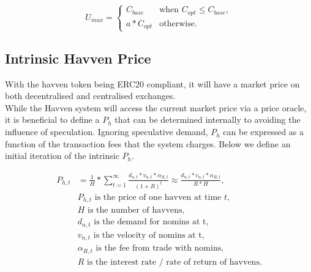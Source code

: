 \[
U_{max} = 
\begin{cases}
 C_{base} &\mbox{when } C_{opt} \leq C_{base}, \\[1em]
 a * C_{opt} &\mbox{otherwise}.
 \end{cases}
\]

\begin{center}
\end{center}

\newpage

\subsection{Intrinsic Havven Price} With the havven token being ERC20 compliant, it will have a market price on both decentralised and centralised exchanges. \\

\noindent While the Havven system will access the current market price via a price oracle, it is beneficial to define a $P_h$ that can be determined internally to avoiding the influence of speculation. Ignoring speculative demand, $P_h$ can be expressed as a function of the transaction fees that the system charges. Below we define an initial iteration of the intrinsic $P_h$.

\begin{align*} 
P_{h,t} &= \frac{1}{H}* \sum\limits_{t=1}^\infty \frac{d_{n,t} *v_{n,t} * \alpha_{R,t}}{(1+R)^t} \approx \frac{d_{n,t} *v_{n,t} * \alpha_{R,t}}{R * H}, \\
& P_{h,t} \text{ is the price of one havven at time } t, \\
& H \text{ is the number of havvens}, \\
& d_{n,t} \text{ is the demand for nomins at t}, \\
& v_{n,t} \text{ is the velocity of nomins at t}, \\
& \alpha_{R,t} \text{ is the fee from trade with nomins}, \\
& R \text{ is the interest rate / rate of return of havvens}. \\
\end{align*}

\newpage